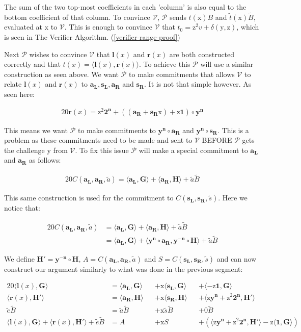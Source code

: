 \documentclass{article}
\newcommand{\eq}[1]{\begin{alignat*}{20}#1\end{alignat*}}
\renewcommand{\vec}[1]{\boldsymbol{#1}}
\newcommand{\ran}[1]{\mathrm{#1}}
\newcommand{\vecran}[1]{\mathbf{#1}}
\newcommand{\V}{\mathcal{V}}
\renewcommand{\P}{\mathcal{P}}
\newcommand{\tB}{\widetilde{B}}
\renewcommand{\tt}{\widetilde{t}}
\newcommand{\dotp}[2]{\langle #1, #2 \rangle}
\newcommand{\opn}[1]{\operatorname{#1}}
\newcommand{\vecl}[1]{\vec{#1_{\opn{L}}}}
\newcommand{\vecr}[1]{\vec{#1_{\opn{R}}}}
\begin{document}
The sum of the two top-most coefficients in each 'column' is also
equal to the bottom coefficient of that column. To convince $\V$, $\P$
sends $t(\ran{x})B$ and $\tt(\ran{x})\tB$, evaluated at $\ran{x}$
to $\V$. This is enough to convince $\V$ that $t_0 = \ran{z^2}v +
\delta(\ran{y},\ran{z})$, which is seen in The Verifier Algorithm.
(\ref{verifier-range-proof})

Next $\P$ wishes to convince $\V$ that $\vec{l}(x)$ and
$\vec{r}(x)$ are both constructed correctly and that $t(x) =
\dotp{\vec{l}(x)}{\vec{r}(x)}$. To achieve this $\P$ will use a similar
construction as seen above. We want $\P$ to make commitments that allows
$\V$ to relate $\vec{l}(x)$ and $\vec{r}(x)$ to $\vecl{a}, \vecl{s},
\vecr{a}$ and $\vecr{s}$. It is not that simple however. As seen here:

\eq{
	\vec{r}(x) = \ran{z^2}\vec{2^n} + ((\vecr{a} + \vecr{s}\ran{x}) + \ran{z}\vec{1})\circ\vecran{y^n}
}

This means we want $\P$ to make commitments to $\vec{y^n}\circ \vecr{a}$ and $\vec{y^n}\circ\vecr{s}$. This is a problem as these commitments need to be made and sent to $\V$ BEFORE $\P$ gets the challenge $\ran{y}$ from $\V$. To fix this issue $\P$ will make a special commitment to $\vecl{a}$ and $\vecr{a}$ as follows:

\eq{
	C(\vecl{a}, \vecr{a}, \widetilde{a}) = \dotp{\vecl{a}}{\vec{G}} + \dotp{\vecr{a}}{\vec{H}} + \widetilde{a}\tB
}

This same construction is used for the commitment to $C(\vecl{s},
\vecr{s}, \widetilde{s})$. Here we notice that:

\eq{
	C(\vecl{a}, \vecr{a}, \widetilde{a}) &= \dotp{\vecl{a}}{\vec{G}} + \dotp{\vecr{a}}{\vec{H}} + \widetilde{a}\tB \\
	&= \dotp{\vecl{a}}{\vec{G}} + \dotp{\vecran{y^n}\circ \vecr{a}}{\vecran{y^{-n}}\circ \vec{H}} + \widetilde{a}\tB
}

We define $\vec{H'} = \vecran{y^{-n}}\circ\vec{H}$, $A = C(\vecl{a},\vecr{a}, \widetilde{a})$ and $S = C(\vecl{s}, \vecr{s}, \widetilde{s})$ and can now construct our argument similarly to what was done in the previous segment:

\eq{
	\dotp{\vec{l}(x)}{\vec{G}} &= \dotp{\vecl{a}}{\vec{G}} &&+ \ran{x}\dotp{\vecl{s}}{\vec{G}} &&+ \dotp{-\ran{z}\vec{1}}{\vec{G}} \\
	\dotp{\vec{r}(x)}{\vec{H'}} &= \dotp{\vecr{a}}{\vec{H}} &&+ \ran{x}\dotp{\vecr{s}}{\vec{H}} &&+ \dotp{\ran{z}\vecran{y^n} + \ran{z^2}\vec{2^n}}{\vec{H'}}\\
	\widetilde{e}\tB &= \widetilde{a}\tB &&+ \ran{x}\widetilde{s}\tB &&+ 0 \tB \\
	\dotp{\vec{l}(x)}{\vec{G}} + \dotp{\vec{r}(x)}{\vec{H'}} + \widetilde{e}\tB &= A &&+ \ran{x}S &&+ (\dotp{\ran{z}\vecran{y^n} + \ran{z^2}\vec{2^n}}{\vec{H'}} - \ran{z}\dotp{\vec{1}}{\vec{G}})
}
\end{document}
